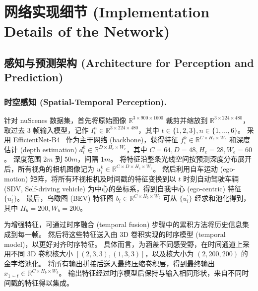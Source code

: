 \section{网络实现细节 (Implementation Details of the Network)}
\subsection{感知与预测架构 (Architecture for Perception and Prediction)}

\subsubsection{时空感知 (Spatial-Temporal Perception).}
针对 nuScenes 数据集，首先将原始图像 $\mathbb{R}^{3 \times 900 \times 1600}$ 裁剪并缩放到 $\mathbb{R}^{3 \times 224 \times 480}$，取过去 3 帧输入模型，记作 $I_t^n \in \mathbb{R}^{3 \times 224 \times 480}$，其中 $t \in \{1,2,3\}, n \in \{1,\dots,6\}$。
%
采用 EfficientNet-B4~\cite{tan2019efficientnet} 作为主干网络 (backbone)，获得特征 $f_i^k \in \mathbb{R}^{C \times H_e \times W_e}$ 和深度估计 (depth estimation) $d_i^k \in \mathbb{R}^{D \times H_e \times W_e}$，其中 $C = 64, D = 48, H_e = 28, W_e = 60$。
%
深度范围 $2m$ 到 $50m$，间隔 $1m$。
%
将特征沿整条光线空间按预测深度分布展开后，所有视角的相机图像记为 $u_i^k \in \mathbb{R}^{C \times D \times H_e \times W_e}$。
%
然后利用自车运动 (ego-motion) 矩阵，将所有环视相机及时间戳的特征变换到以 $t$ 时刻自动驾驶车辆 (SDV, Self-driving vehicle) 为中心的坐标系，得到自我中心 (ego-centric) 特征 $\{u_i^{'}\}$。
%
最后，鸟瞰图 (BEV) 特征图 $b_i \in \mathbb{R}^{C \times H_b \times W_b}$ 可从 $\{u_i^{'}\}$ 经求和池化得到，其中 $H_b =200, W_b = 200$。

为增强特征，可通过时序融合 (temporal fusion) 步骤中的累积方法将历史信息集成到每一帧。
%
然后将这些特征送入由 3D 卷积实现的时序模型 (temporal model)，以更好对齐时序特征。
%
具体而言，为涵盖不同感受野，在时间通道上采用不同 3D 卷积核大小 $[(2,3,3),(1,3,3)]$，以及核大小为 $(2,200,200)$ 的金字塔池化。
%
将所有输出拼接后送入最终压缩卷积层，得到最终输出 $x_{1 \sim t} \in \mathbb{R}^{C \times H_b \times W_b}$。
%
输出特征经过时序模型后保持与输入相同形状，来自不同时间戳的特征得以集成。

\noindent
